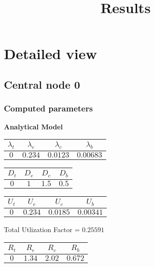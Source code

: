 \documentclass{article}
\title{Results}
\begin{document}
\section{Detailed view}
\subsection{Central node 0}
\subsubsection{Computed parameters}
\begin{minipage}{0.5\textwidth}
\centering	\textbf{Analytical Model}
\begin{table}[H]
\centering
\begin{tabular}{@{}cccc@{}}
\toprule
$\lambda_t$ & $\lambda_e$ & $\lambda_c$ & $\lambda_b$\\
\midrule
$0$ & $0.234$ & $0.0123$ & $0.00683$\\
\bottomrule
\end{tabular}
\end{table}\begin{table}[H]
\centering
\begin{tabular}{@{}cccc@{}}
\toprule
$D_t$ & $D_e$ & $D_c$ & $D_b$\\
\midrule
$0$ & $1$ & $1.5$ & $0.5$\\
\bottomrule
\end{tabular}
\end{table}\begin{table}[H]
\centering
\begin{tabular}{@{}cccc@{}}
\toprule
$U_t$ & $U_e$ & $U_c$ & $U_b$\\
\midrule
$0$ & $0.234$ & $0.0185$ & $0.00341$\\
\bottomrule
\end{tabular}
\end{table}
\centering Total Utlization Factor = $0.25591$
\begin{table}[H]
\centering
\begin{tabular}{@{}cccc@{}}
\toprule
$R_t$ & $R_e$ & $R_c$ & $R_b$\\
\midrule
$0$ & $1.34$ & $2.02$ & $0.672$\\
\bottomrule
\end{tabular}
\end{table}
\end{minipage}
\end{document}
